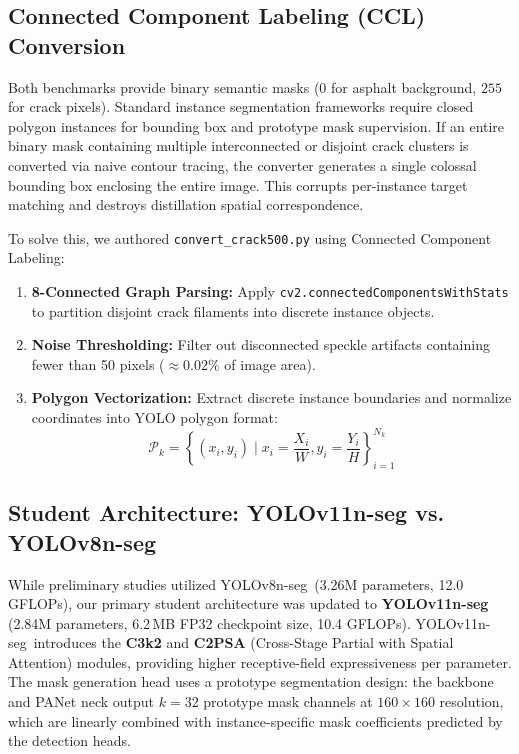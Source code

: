 \documentclass[11pt,a4paper]{article}
\newcommand{\yolo}{YOLOv11n-seg}
\newcommand{\yolov}{YOLOv8n-seg}
\begin{document}
\subsection{Connected Component Labeling (CCL) Conversion}
Both benchmarks provide binary semantic masks ($0$ for asphalt background, $255$ for crack pixels). 
Standard instance segmentation frameworks require closed polygon instances for bounding box and prototype mask supervision. 
If an entire binary mask containing multiple interconnected or disjoint crack clusters is converted via naive contour tracing, the converter generates a single colossal bounding box enclosing the entire image. This corrupts per-instance target matching and destroys distillation spatial correspondence.

To solve this, we authored \texttt{convert\_crack500.py} using Connected Component Labeling:
\begin{enumerate}[leftmargin=1.5em]
  \item \textbf{8-Connected Graph Parsing:} Apply \texttt{cv2.connectedComponentsWithStats} to partition disjoint crack filaments into discrete instance objects.
  \item \textbf{Noise Thresholding:} Filter out disconnected speckle artifacts containing fewer than 50 pixels ($\approx 0.02\%$ of image area).
  \item \textbf{Polygon Vectorization:} Extract discrete instance boundaries and normalize coordinates into YOLO polygon format:
  \begin{equation}
    \mathcal{P}_k = \left\{ (x_i, y_i) \mid x_i = \frac{X_i}{W}, y_i = \frac{Y_i}{H} \right\}_{i=1}^{N_k}
  \end{equation}
\end{enumerate}

\subsection{Student Architecture: YOLOv11n-seg vs. YOLOv8n-seg}
While preliminary studies utilized \yolov\ (3.26M parameters, 12.0 GFLOPs), our primary student architecture was updated to \textbf{\yolo} (2.84M parameters, 6.2\,MB FP32 checkpoint size, 10.4 GFLOPs). 
\yolo\ introduces the \textbf{C3k2} and \textbf{C2PSA} (Cross-Stage Partial with Spatial Attention) modules, providing higher receptive-field expressiveness per parameter. 
The mask generation head uses a prototype segmentation design: the backbone and PANet neck output $k=32$ prototype mask channels at $160\times160$ resolution, which are linearly combined with instance-specific mask coefficients predicted by the detection heads.
\end{document}

